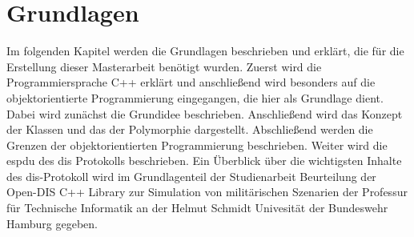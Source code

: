\chapter{Grundlagen}\label{grundlagen}

Im folgenden Kapitel werden die Grundlagen beschrieben und erklärt, die für die Erstellung  dieser Masterarbeit benötigt wurden. Zuerst wird die Programmiersprache C++ erklärt und anschließend wird besonders auf die objektorientierte Programmierung eingegangen, die hier als Grundlage dient. Dabei wird zunächst die Grundidee beschrieben. Anschließend wird das Konzept der Klassen und das der Polymorphie dargestellt. Abschließend werden die Grenzen der objektorientierten Programmierung beschrieben.  Weiter wird  die \ac{espdu} des \ac{dis} Protokolls beschrieben. Ein Überblick über die wichtigsten Inhalte des \ac{dis}-Protokoll wird im Grundlagenteil der Studienarbeit \glqq Beurteilung der Open-DIS C++ Library zur Simulation von militärischen Szenarien\grqq{}\cite{HenryWinkel.} der Professur für Technische Informatik an der Helmut Schmidt Univesität der Bundeswehr Hamburg gegeben.


